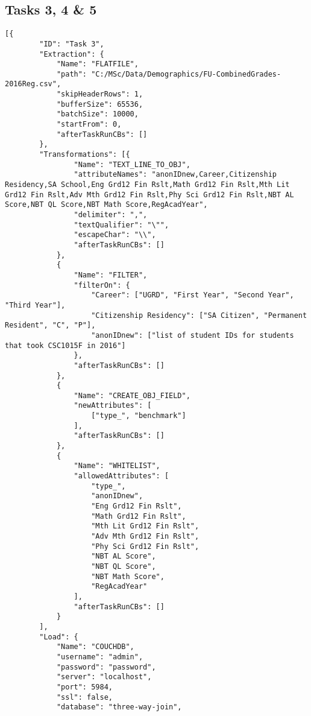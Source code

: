 \subsection{Tasks 3, 4 \& 5}
\label{netl-tasks-3-4-5-config}
\begin{verbatim}
[{
        "ID": "Task 3",
        "Extraction": {
            "Name": "FLATFILE",
            "path": "C:/MSc/Data/Demographics/FU-CombinedGrades-2016Reg.csv",
            "skipHeaderRows": 1,
            "bufferSize": 65536,
            "batchSize": 10000,
            "startFrom": 0,
            "afterTaskRunCBs": []
        },
        "Transformations": [{
                "Name": "TEXT_LINE_TO_OBJ",
                "attributeNames": "anonIDnew,Career,Citizenship Residency,SA School,Eng Grd12 Fin Rslt,Math Grd12 Fin Rslt,Mth Lit Grd12 Fin Rslt,Adv Mth Grd12 Fin Rslt,Phy Sci Grd12 Fin Rslt,NBT AL Score,NBT QL Score,NBT Math Score,RegAcadYear",
                "delimiter": ",",
                "textQualifier": "\"",
                "escapeChar": "\\",
                "afterTaskRunCBs": []
            },
            {
                "Name": "FILTER",
                "filterOn": {
                    "Career": ["UGRD", "First Year", "Second Year", "Third Year"],
                    "Citizenship Residency": ["SA Citizen", "Permanent Resident", "C", "P"],
                    "anonIDnew": ["list of student IDs for students that took CSC1015F in 2016"]
                },
                "afterTaskRunCBs": []
            },
            {
                "Name": "CREATE_OBJ_FIELD",
                "newAttributes": [
                    ["type_", "benchmark"]
                ],
                "afterTaskRunCBs": []
            },
            {
                "Name": "WHITELIST",
                "allowedAttributes": [
                    "type_",
                    "anonIDnew",
                    "Eng Grd12 Fin Rslt",
                    "Math Grd12 Fin Rslt",
                    "Mth Lit Grd12 Fin Rslt",
                    "Adv Mth Grd12 Fin Rslt",
                    "Phy Sci Grd12 Fin Rslt",
                    "NBT AL Score",
                    "NBT QL Score",
                    "NBT Math Score",
                    "RegAcadYear"
                ],
                "afterTaskRunCBs": []
            }
        ],
        "Load": {
            "Name": "COUCHDB",
            "username": "admin",
            "password": "password",
            "server": "localhost",
            "port": 5984,
            "ssl": false,
            "database": "three-way-join",

\end{verbatim}
